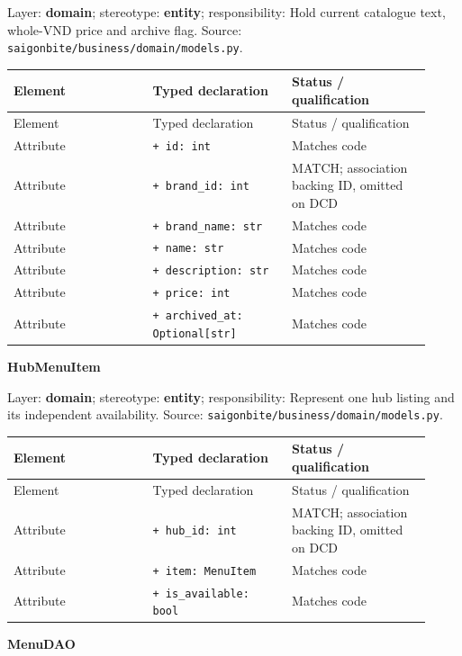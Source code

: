 Layer: \textbf{domain}; stereotype: \textbf{\guillemotleft{}entity\guillemotright{}}; responsibility: Hold current catalogue text, whole-VND price and archive flag. Source: \texttt{saigonbite/\allowbreak{}business/\allowbreak{}domain/\allowbreak{}models.\allowbreak{}py}.

\begin{longtable}{>{\raggedright\arraybackslash}p{0.3067\linewidth}>{\raggedright\arraybackslash}p{0.3067\linewidth}>{\raggedright\arraybackslash}p{0.3067\linewidth}}
Element & Typed declaration & Status / qualification \\
\hline\endfirsthead
Element & Typed declaration & Status / qualification \\
\hline\endhead
Attribute & \texttt{+ id: int} & Matches code \\
Attribute & \texttt{+ brand\_\allowbreak{}id: int} & MATCH; association backing ID, omitted on DCD \\
Attribute & \texttt{+ brand\_\allowbreak{}name: str} & Matches code \\
Attribute & \texttt{+ name: str} & Matches code \\
Attribute & \texttt{+ description: str} & Matches code \\
Attribute & \texttt{+ price: int} & Matches code \\
Attribute & \texttt{+ archived\_\allowbreak{}at: Optional[str]} & Matches code \\
\end{longtable}
\textbf{HubMenuItem}

Layer: \textbf{domain}; stereotype: \textbf{\guillemotleft{}entity\guillemotright{}}; responsibility: Represent one hub listing and its independent availability. Source: \texttt{saigonbite/\allowbreak{}business/\allowbreak{}domain/\allowbreak{}models.\allowbreak{}py}.

\begin{longtable}{>{\raggedright\arraybackslash}p{0.3067\linewidth}>{\raggedright\arraybackslash}p{0.3067\linewidth}>{\raggedright\arraybackslash}p{0.3067\linewidth}}
Element & Typed declaration & Status / qualification \\
\hline\endfirsthead
Element & Typed declaration & Status / qualification \\
\hline\endhead
Attribute & \texttt{+ hub\_\allowbreak{}id: int} & MATCH; association backing ID, omitted on DCD \\
Attribute & \texttt{+ item: MenuItem} & Matches code \\
Attribute & \texttt{+ is\_\allowbreak{}available: bool} & Matches code \\
\end{longtable}
\textbf{MenuDAO}

